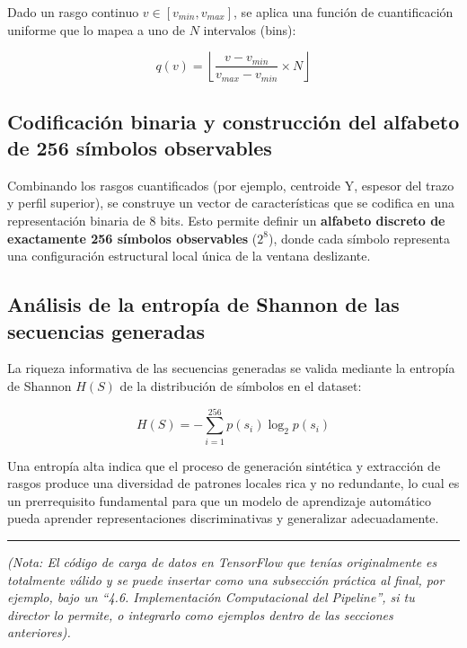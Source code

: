 \documentclass[
  spanish,
  us-letterpaper,
  DIV=11,
  numbers=noendperiod]{scrreprt}
\begin{document}
Dado un rasgo continuo \(v \in [v_{min}, v_{max}]\), se aplica una
función de cuantificación uniforme que lo mapea a uno de \(N\)
intervalos (bins):

\[
q(v) = \left\lfloor \frac{v - v_{min}}{v_{max} - v_{min}} \times N \right\rfloor
\]

\subsection{Codificación binaria y construcción del alfabeto de 256
símbolos
observables}\label{codificaciuxf3n-binaria-y-construcciuxf3n-del-alfabeto-de-256-suxedmbolos-observables}

Combinando los rasgos cuantificados (por ejemplo, centroide Y, espesor
del trazo y perfil superior), se construye un vector de características
que se codifica en una representación binaria de 8 bits. Esto permite
definir un \textbf{alfabeto discreto de exactamente 256 símbolos
observables} (\(2^8\)), donde cada símbolo representa una configuración
estructural local única de la ventana deslizante.

\subsection{Análisis de la entropía de Shannon de las secuencias
generadas}\label{anuxe1lisis-de-la-entropuxeda-de-shannon-de-las-secuencias-generadas}

La riqueza informativa de las secuencias generadas se valida mediante la
entropía de Shannon \(H(S)\) de la distribución de símbolos en el
dataset:

\[
H(S) = - \sum_{i=1}^{256} p(s_i) \log_2 p(s_i)
\]

Una entropía alta indica que el proceso de generación sintética y
extracción de rasgos produce una diversidad de patrones locales rica y
no redundante, lo cual es un prerrequisito fundamental para que un
modelo de aprendizaje automático pueda aprender representaciones
discriminativas y generalizar adecuadamente.

\begin{center}\rule{0.5\linewidth}{0.5pt}\end{center}

\emph{(Nota: El código de carga de datos en TensorFlow que tenías
originalmente es totalmente válido y se puede insertar como una
subsección práctica al final, por ejemplo, bajo un ``4.6. Implementación
Computacional del Pipeline'', si tu director lo permite, o integrarlo
como ejemplos dentro de las secciones anteriores).}
\end{document}

